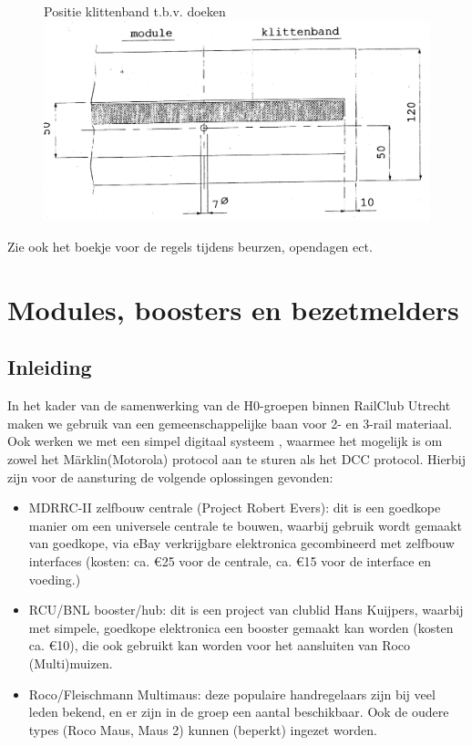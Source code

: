 \documentclass[12pt,a4paper]{report}
\newcommand*{\marklin}{M\"{a}rklin}
\begin{document}
\begin{figure}[ht]
  \captionbox
  {Positie klittenband t.b.v. doeken\label{figuur17}}
  {\includegraphics[scale=0.4]{images/rcu_figuur17}}
\end{figure}

Zie ook het boekje voor de regels tijdens beurzen, opendagen ect.

\chapter{Modules, boosters en bezetmelders}

\section{Inleiding}

In het kader van de samenwerking van de H0-groepen binnen RailClub Utrecht maken we gebruik van een gemeenschappelijke baan voor 2- en 3-rail materiaal. Ook werken we met een simpel digitaal systeem , waarmee het mogelijk is om zowel het \marklin (Motorola) protocol aan te sturen als het DCC protocol.
Hierbij zijn voor de aansturing de volgende oplossingen gevonden:
\begin{itemize}
\item MDRRC-II zelfbouw centrale (Project Robert Evers): dit is een goedkope manier om een universele centrale te bouwen, waarbij gebruik wordt gemaakt van goedkope, via eBay verkrijgbare elektronica gecombineerd met zelfbouw interfaces (kosten: ca. \euro 25 voor de centrale, ca. \euro 15 voor de interface en voeding.)
\item RCU/BNL booster/hub: dit is een project van clublid Hans Kuijpers, waarbij met simpele, goedkope elektronica een booster gemaakt kan worden (kosten ca. \euro 10), die ook gebruikt kan worden voor het aansluiten van Roco (Multi)muizen.
\item Roco/Fleischmann Multimaus: deze populaire handregelaars zijn bij veel leden bekend, en er zijn in de groep een aantal beschikbaar. Ook de oudere types (Roco Maus, Maus 2) kunnen (beperkt) ingezet worden.
\end{itemize}
\end{document}
